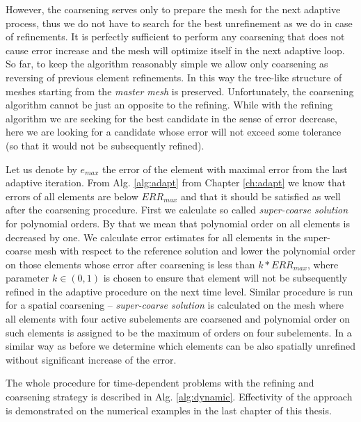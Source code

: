 However, the coarsening serves only to prepare the mesh for the next adaptive process, thus we do not have to search for the best unrefinement as we do in case of refinements. It is perfectly sufficient to perform any coarsening that does not cause error increase and the mesh will optimize itself in the next adaptive loop.
So far, to keep the algorithm reasonably simple we allow only coarsening as reversing of previous element refinements. In this way the tree-like structure of meshes starting from the {\em master mesh} is preserved. Unfortunately, the coarsening algorithm cannot be just an opposite to the refining. While with the refining algorithm we are seeking for the best candidate in the sense of error decrease, here we are looking for a candidate whose error will not exceed some tolerance (so that it would not be subsequently refined).

Let us denote by $e_{max}$ the error of the element with maximal error from the last adaptive iteration. From Alg. \ref{alg:adapt} from Chapter \ref{ch:adapt} we know that errors of all elements are below $ERR_{max}$ and that it should be satisfied as well after the coarsening procedure. First we calculate so called {\em super-coarse solution} for polynomial orders. By that we mean that polynomial order on all elements is decreased by one. We calculate error estimates for all elements in the super-coarse mesh with respect to the reference solution and lower the polynomial order on those elements whose error after coarsening is less than $k * ERR_{max}$, where parameter $k\in(0,1)$ is chosen to ensure that element will not be subsequently refined in the adaptive procedure on the next time level. Similar procedure is run for a spatial coarsening -- {\em super-coarse solution} is calculated on the mesh where all elements with four active subelements are coarsened and polynomial order on such elements is assigned to be the maximum of orders on four subelements. In a similar way as before we determine which elements can be also spatially unrefined without significant increase of the error.

The whole procedure for time-dependent problems with the refining and coarsening strategy is described in Alg. \ref{alg:dynamic}. Effectivity of the approach is demonstrated on the numerical examples in the last chapter of this thesis.

